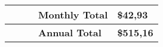 \begin{adjustbox}{angle=90}
\begin{tabularx}{\textheight}{|l|X|X|X|X|}
                                        &                           &                 & \textbf{Monthly Total}                                                                                                                                                                                                                           & \textbf{\$42,93}                         \\ \hline
                                        &                           &                 & \textbf{Annual Total}                                                                                                                                                                                                                            & \textbf{\$515,16}                        \\ \hline
\end{tabularx}
\label{tab:azPriceT1_2}
\end{adjustbox}
